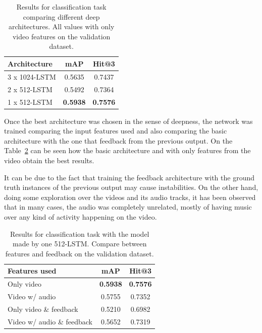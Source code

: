\begin{table}[H]
\begin{center}
\begin{tabular}{|l|c|c|}
\hline
Architecture & mAP & Hit@3 \\
\hline\hline
3 x 1024-LSTM & 0.5635 & 0.7437 \\
2 x 512-LSTM & 0.5492 & 0.7364 \\
1 x 512-LSTM & \bf0.5938 & \bf0.7576 \\
\hline
\end{tabular}
\end{center}
\caption{Results for classification task comparing different deep architectures. All values with
         only video features on the validation dataset.}
\label{table:classification_by_architecture}
\end{table}

Once the best architecture was chosen in the sense of deepness, the network was trained comparing the input features used and also comparing the basic architecture with the one that feedback from the previous output. On the Table~\ref{table:classification_by_features} can be seen how the basic architecture and with only features from the video obtain the best results.

It can be due to the fact that training the feedback architecture with the ground truth instances of the previous output may cause instabilities\cite{}.%
On the other hand, doing some exploration over the videos and its audio tracks, it has been observed that in many cases, the audio was completely unrelated, mostly of having music over any kind of activity happening on the video. 

\begin{table}[H]
\begin{center}
\begin{tabular}{|l|c|c|}
\hline
Features used & mAP & Hit@3 \\
\hline\hline
Only video & \bf0.5938 & \bf0.7576 \\
Video w/ audio & 0.5755 & 0.7352 \\
Only video \& feedback & 0.5210 & 0.6982 \\
Video w/ audio \& feedback & 0.5652 & 0.7319 \\
\hline
\end{tabular}
\end{center}
\caption{Results for classification task with the model made by one 512-LSTM. Compare between
         features and feedback on the validation dataset.}
\label{table:classification_by_features}
\end{table}

